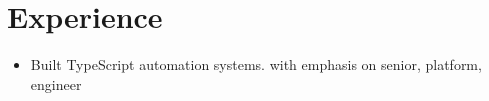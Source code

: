 \documentclass{article}
\begin{document}
\section{Experience}
\begin{itemize}
\item Built TypeScript automation systems.
 with emphasis on senior, platform, engineer
\end{itemize}
\end{document}
